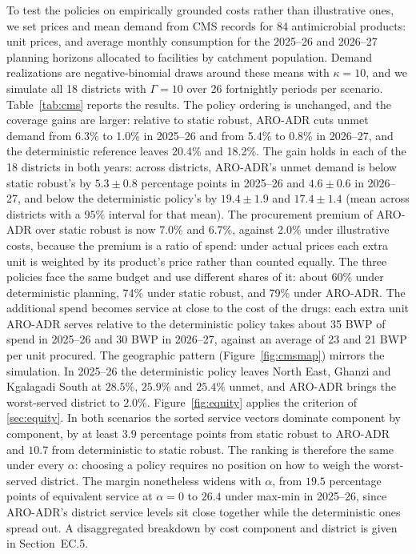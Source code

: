 \documentclass[11pt]{article}
\begin{document}
To test the policies on empirically grounded costs rather than illustrative ones, we set prices and mean demand from CMS records for 84 antimicrobial products: unit prices, and average monthly consumption for the 2025--26 and 2026--27 planning horizons allocated to facilities by catchment population.
Demand realizations are negative-binomial draws around these means with $\kappa = 10$, and we simulate all 18 districts with $\Gamma = 10$ over 26 fortnightly periods per scenario.
Table~\ref{tab:cms} reports the results.
The policy ordering is unchanged, and the coverage gains are larger: relative to static robust, ARO-ADR cuts unmet demand from 6.3\% to 1.0\% in 2025--26 and from 5.4\% to 0.8\% in 2026--27, and the deterministic reference leaves 20.4\% and 18.2\%.
The gain holds in each of the 18 districts in both years: across districts, ARO-ADR's unmet demand is below static robust's by $5.3 \pm 0.8$ percentage points in 2025--26 and $4.6 \pm 0.6$ in 2026--27, and below the deterministic policy's by $19.4 \pm 1.9$ and $17.4 \pm 1.4$ (mean across districts with a $95\%$ interval for that mean).
The procurement premium of ARO-ADR over static robust is now 7.0\% and 6.7\%, against 2.0\% under illustrative costs, because the premium is a ratio of spend: under actual prices each extra unit is weighted by its product's price rather than counted equally.
The three policies face the same budget and use different shares of it: about 60\% under deterministic planning, 74\% under static robust, and 79\% under ARO-ADR.
The additional spend becomes service at close to the cost of the drugs: each extra unit ARO-ADR serves relative to the deterministic policy takes about 35 BWP of spend in 2025--26 and 30 BWP in 2026--27, against an average of 23 and 21 BWP per unit procured.
The geographic pattern (Figure~\ref{fig:cmsmap}) mirrors the simulation.
In 2025--26 the deterministic policy leaves North East, Ghanzi and Kgalagadi South at $28.5\%$, $25.9\%$ and $25.4\%$ unmet, and ARO-ADR brings the worst-served district to $2.0\%$.
Figure~\ref{fig:equity} applies the criterion of \Sec\ref{sec:equity}.
In both scenarios the sorted service vectors dominate component by component, by at least $3.9$ percentage points from static robust to ARO-ADR and $10.7$ from deterministic to static robust.
The ranking is therefore the same under every $\alpha$: choosing a policy requires no position on how to weigh the worst-served district.
The margin nonetheless widens with $\alpha$, from $19.5$ percentage points of equivalent service at $\alpha = 0$ to $26.4$ under max-min in 2025--26, since ARO-ADR's district service levels sit close together while the deterministic ones spread out.
A disaggregated breakdown by cost component and district is given in Section~EC.5.
\end{document}

